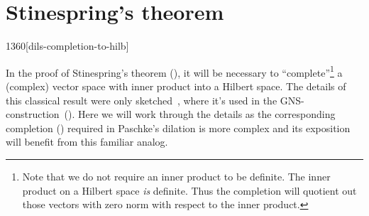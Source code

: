 \section{Stinespring's theorem}
\begin{parsec}{1360}[dils-completion-to-hilb]%
\begin{point}{10}%
In the proof of Stinespring's theorem
    (),
    it will be necessary to
    ``complete''\footnote{Note that
        we do not require an inner product to be definite.
    The inner product on a Hilbert space \emph{is} definite.
    Thus the completion will quotient out those vectors with
        zero norm with respect to the inner product.}
        a (complex) vector space with inner product into a Hilbert space.
The details of this classical result were only
    sketched~,
    where it's used in the GNS-construction~().
Here we will work through the details
    as the corresponding completion () required
    in Paschke's dilation
    is more complex and its exposition will benefit
    from this familiar analog.
\end{point}


\end{parsec}
